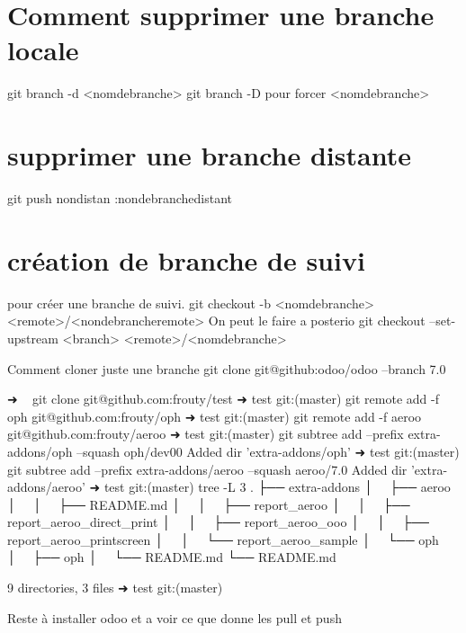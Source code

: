 \documentclass[12pt,a4paper]{article}
\begin{document}
\section{Comment supprimer une branche locale}
git branch -d <nomdebranche>
git branch -D pour forcer <nomdebranche>
\section{supprimer une branche distante}
git push nondistan :nondebranchedistant

\section{création de branche de suivi}
pour créer une branche de suivi.
git checkout -b <nomdebranche> <remote>/<nondebrancheremote>
On peut le faire a posterio
git checkout --set-upstream <branch> <remote>/<nomdebranche>

Comment cloner juste une branche 
git clone git@github:odoo/odoo --branch 7.0

➜  ~  git clone git@github.com:frouty/test
➜  test git:(master) git remote add -f oph git@github.com:frouty/oph           
➜  test git:(master) git remote add -f aeroo git@github.com:frouty/aeroo
➜  test git:(master) git subtree add --prefix extra-addons/oph --squash oph/dev00
Added dir 'extra-addons/oph'
➜  test git:(master) git subtree add --prefix extra-addons/aeroo --squash aeroo/7.0
Added dir 'extra-addons/aeroo'
➜  test git:(master) tree -L 3
.
├── extra-addons
│   ├── aeroo
│   │   ├── README.md
│   │   ├── report_aeroo
│   │   ├── report_aeroo_direct_print
│   │   ├── report_aeroo_ooo
│   │   ├── report_aeroo_printscreen
│   │   └── report_aeroo_sample
│   └── oph
│       ├── oph
│       └── README.md
└── README.md

9 directories, 3 files
➜  test git:(master) 


Reste à installer odoo et a voir ce que donne les pull et push
\end{document}
